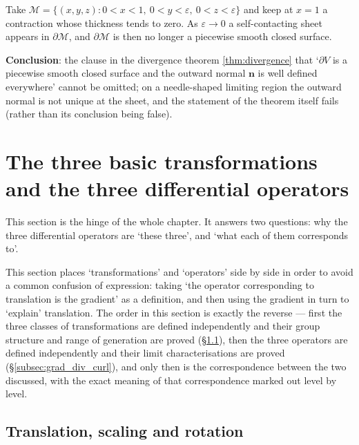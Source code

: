 \begin{example}\label{ex:needle_domain}
Take $\mathcal{M} = \{(x,y,z) : 0<x<1,\ 0<y<\varepsilon,\ 0<z<\varepsilon\}$ and keep at $x=1$ a contraction whose thickness tends to zero. As $\varepsilon \to 0$ a self-contacting sheet appears in $\partial\mathcal M$, and $\partial \mathcal M$ is then no longer a piecewise smooth closed surface.

\textbf{Conclusion}: the clause in the divergence theorem \cref{thm:divergence} that `$\partial V$ is a piecewise smooth closed surface and the outward normal $\mathbf n$ is well defined everywhere' cannot be omitted; on a needle-shaped limiting region the outward normal is not unique at the sheet, and the statement of the theorem itself fails (rather than its conclusion being false).
\end{example}

\section{The three basic transformations and the three differential operators}\label{sec:trans_scale_rotate}

This section is the hinge of the whole chapter. It answers two questions: why the three differential operators are `these three', and `what each of them corresponds to'.

\begin{remark}
This section places `transformations' and `operators' side by side in order to avoid a common confusion of expression: taking `the operator corresponding to translation is the gradient' as a definition, and then using the gradient in turn to `explain' translation. The order in this section is exactly the reverse --- first the three classes of transformations are defined independently and their group structure and range of generation are proved (\S\ref{subsec:trans_scale_rotate}), then the three operators are defined independently and their limit characterisations are proved (\S\ref{subsec:grad_div_curl}), and only then is the correspondence between the two discussed, with the exact meaning of that correspondence marked out level by level.
\end{remark}

\subsection{Translation, scaling and rotation}\label{subsec:trans_scale_rotate}


